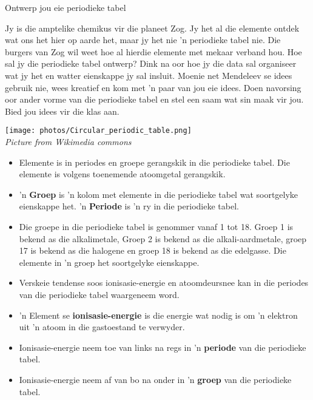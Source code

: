 \begin{activity}{Ontwerp jou eie periodieke tabel}
            \nopagebreak
            \label{m38760*eip-603}
\begin{minipage}{.5\textwidth}
Jy is die amptelike chemikus vir die planeet Zog. Jy het al die elemente ontdek wat ons het hier op aarde het, maar jy het nie 'n periodieke tabel nie. Die burgers van Zog wil weet hoe al hierdie elemente met mekaar verband hou. Hoe sal jy die periodieke tabel ontwerp? Dink na oor hoe jy die data sal organiseer wat jy het en watter eienskappe jy sal insluit. Moenie net Mendeleev se idees gebruik nie, wees kreatief en kom met 'n paar van jou eie idees. Doen navorsing oor ander vorme van die periodieke tabel en stel een saam wat sin maak vir jou. Bied jou idees vir die klas aan.
\end{minipage}
\begin{minipage}{.5\textwidth}
\begin{center}
\texttt{[image: photos/Circular\_periodic\_table.png]}\\
\textsl{Picture from Wikimedia commons}
\end{center}
\end{minipage}

\end{activity}
            \nopagebreak
            \label{m38757*uid0123}\begin{itemize}[noitemsep]
            \label{m38757*id79342}\item Elemente is in periodes en groepe gerangskik in die periodieke tabel. Die elemente is volgens toenemende atoomgetal gerangskik.
\label{m38757*id97342}\item 'n \textbf{Groep} is 'n kolom met elemente in die periodieke tabel wat soortgelyke eienskappe het. 'n \textbf{Periode} is 'n ry in die periodieke tabel.
\item Die groepe in die periodieke tabel is genommer vanaf 1 tot 18. Groep 1 is bekend as die alkalimetale, Groep 2 is bekend as die alkali-aardmetale, groep 17 is bekend as die halogene en groep 18 is bekend as die edelgasse. Die elemente in 'n groep het soortgelyke eienskappe.
\item Verskeie tendense soos ionisasie-energie en atoomdeursnee kan in die periodes van die periodieke tabel waargeneem word. \label{m38757*uid184}
\label{m38757*uid186}\item 'n Element se \textbf{ionisasie-energie} is die energie wat nodig is om 'n elektron uit 'n atoom in die gastoestand te verwyder.
\label{m38757*uid187}\item Ionisasie-energie neem toe van links na regs in 'n \textbf{periode} van die periodieke tabel.
\label{m38757*uid188}\item Ionisasie-energie neem af van bo na onder in 'n \textbf{groep} van die periodieke tabel.
\end{itemize}
        \label{m38757*eip-219}
            



